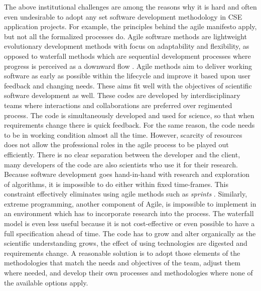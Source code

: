The above institutional challenges are among the reasons why it is
hard and often even undesirable to adopt any set software development
methodology in CSE application projects. For example, the principles
behind the agile manifesto apply, but not all the formalized processes
do. Agile software methods \cite{agile} are lightweight evolutionary development
methods with focus on adaptability and flexibility, as opposed to
waterfall methods which are sequential development processes where
progress is perceived as a downward flow \cite{waterfall}. 
Agile methods aim to deliver working software as early as possible
within the lifecycle and improve it based upon user feedback and
changing needs. These aims fit well with the objectives of scientific
software development as well. 
These codes are developed by interdisciplinary teams where
interactions and collaborations are preferred over regimented
process. The code is simultaneously developed and used for science, so
that when requirements change there is quick feedback.  For the 
same reason, the code needs to be in working condition almost all the
time. However, scarcity of resources does not allow the professional roles in
the agile process to be played out efficiently.  There is no clear
separation between the developer and the client, many developers of
the code are also scientists who use it for their research. 
Because software development goes hand-in-hand with research and
exploration of algorithms, it is impossible to do either within
fixed time-frames. This constraint effectively eliminates using agile
methods such as {\em sprints} \cite{agile}. Similarly, extreme
programming, another component of Agile, is impossible to implement in
an environment which has to incorporate research into the process. The
waterfall model is even less useful because it is not cost-effective
or even possible to have a full specification ahead of time. The code
has to grow and alter organically as the scientific understanding
grows, the effect of using technologies are digested and requirements
change. A reasonable solution is to adopt those elements of the
methodologies that match the needs and objectives of the team,
adjust them where needed, and develop their own processes and
methodologies where none of the available options apply.

